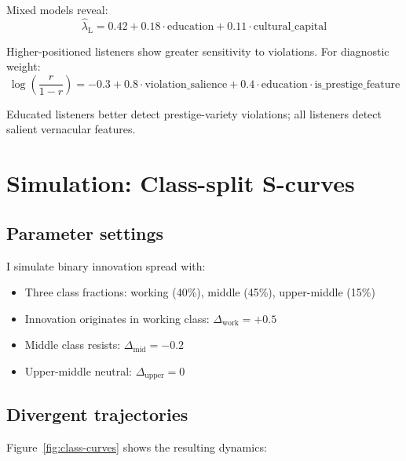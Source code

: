 \documentclass[12pt]{article}
\newcommand{\listener}{\mathrm{L}}
\begin{document}
Mixed models reveal:
\begin{equation}
\hat{\lambda}_{\listener} = 0.42 + 0.18 \cdot \text{education} + 0.11 \cdot \text{cultural\_capital}
\end{equation}

Higher-positioned listeners show greater sensitivity to violations. For diagnostic weight:
\begin{equation}
\log\left(\frac{r}{1-r}\right) = -0.3 + 0.8 \cdot \text{violation\_salience} + 0.4 \cdot \text{education} \cdot \text{is\_prestige\_feature}
\end{equation}

Educated listeners better detect prestige-variety violations; all listeners detect salient vernacular features.

\section{Simulation: Class-split S-curves}

\subsection{Parameter settings}

I simulate binary innovation spread with:
\begin{itemize}
\item Three class fractions: working (40\%), middle (45\%), upper-middle (15\%)
\item Innovation originates in working class: $\Delta_{\text{work}} = +0.5$
\item Middle class resists: $\Delta_{\text{mid}} = -0.2$  
\item Upper-middle neutral: $\Delta_{\text{upper}} = 0$
\end{itemize}

\subsection{Divergent trajectories}

Figure~\ref{fig:class-curves} shows the resulting dynamics:
\end{document}
